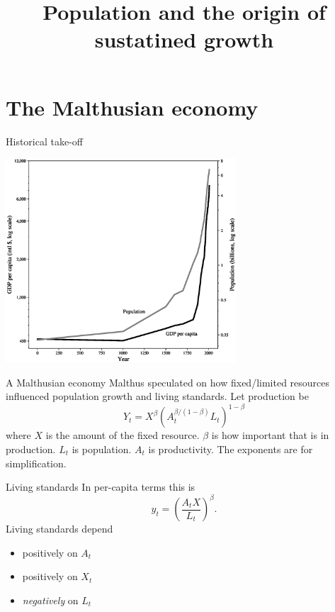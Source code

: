 

\title[Population]{Population and the origin of sustatined growth}



\maketitle

\section{The Malthusian economy}
\begin{frame}{Historical take-off}
\begin{center}
\includegraphics[height=3in]{../Figures/fig-ch9-fig1.eps}
\end{center}
\end{frame}

\begin{frame}{A Malthusian economy}
Malthus speculated on how fixed/limited resources influenced population growth and living standards. Let production be
\begin{equation}
	Y_t = X^{\beta}\left(A_t^{\beta/(1-\beta)} L_t\right)^{1-\beta} \nonumber
\end{equation}
where $X$ is the amount of the fixed resource. $\beta$ is how important that is in production. $L_t$ is population.
\vspace{.25in}\noindent
$A_t$ is productivity. The exponents are for simplification.
\end{frame}

\begin{frame}{Living standards}
In per-capita terms this is
\begin{equation}
	y_t = \left(\frac{A_tX}{L_t}\right)^{\beta}. \label{EQ_y_malthus}
\end{equation}
Living standards depend
\begin{itemize}
	\item positively on $A_t$
	\item positively on $X_t$
	\item \textit{negatively} on $L_t$
\end{itemize}
\end{frame}

